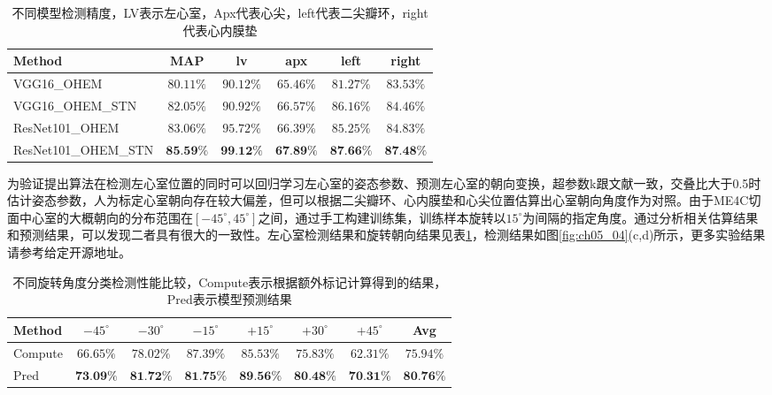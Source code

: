 \begin{table}[!htbp]
    \centering
    \footnotesize%
    \setlength{\tabcolsep}{4pt}%
    \renewcommand{\arraystretch}{1.2}%
    \begin{tabular}{lccccc}
        \cline{1-6}%
           \qquad Method  & MAP & lv &apx &left &right\\
         
        \hline
        VGG16\_OHEM & $80.11\%$ & $90.12\%$& $65.46\%$ & $81.27\%$& $83.53\%$\\        
        \hline
        VGG16\_OHEM\_STN & $82.05\%$ & $90.92\%$& $66.57\%$& $86.16\%$& $84.46\%$ \\
        \hline
        ResNet101\_OHEM & $83.06\%$ & $95.72\%$& $66.39\%$& $85.25\%$& $84.83\%$ \\
        \hline
        ResNet101\_OHEM\_STN & $\textbf{85.59\%}$ & $\textbf{99.12\%}$ & $\textbf{67.89\%}$ & $\textbf{87.66\%}$ & $\textbf{87.48\%}$\\
        \hline\hline
    \end{tabular}
    \caption{不同模型检测精度，LV表示左心室，Apx代表心尖，left代表二尖瓣环，right代表心内膜垫}
    \label{tab:ch05_03}
\end{table}


为验证提出算法在检测左心室位置的同时可以回归学习左心室的姿态参数、预测左心室的朝向变换，超参数k跟文献一致，交叠比大于0.5时估计姿态参数，人为标定心室朝向存在较大偏差，但可以根据二尖瓣环、心内膜垫和心尖位置估算出心室朝向角度作为对照。由于ME4C切面中心室的大概朝向的分布范围在$[-45^{\circ},45^{\circ}]$之间，通过手工构建训练集，训练样本旋转以$15^{\circ}$为间隔的指定角度。通过分析相关估算结果和预测结果，可以发现二者具有很大的一致性。左心室检测结果和旋转朝向结果见表\ref{tab:ch05_03}，检测结果如图\ref{fig:ch05_04}(c,d)所示，更多实验结果请参考给定开源地址。
\begin{table}[!htbp]
    \centering
    \footnotesize%
    \setlength{\tabcolsep}{4pt}%
    \renewcommand{\arraystretch}{1.2}%
    \begin{tabular}{lccccccc}
        \cline{1-8}%
           \qquad Method  & $-45^{\circ}$ & $-30^{\circ}$ & $-15^{\circ}$ & $+15^{\circ}$ & $+30^{\circ}$&$ +45^{\circ}$& Avg\\
         
        \hline
        Compute & $66.65\%$ & $78.02\%$& $87.39\%$& $85.53\%$& $75.83\%$ &$62.31\%$ &$75.94\%$  \\
        \hline
        Pred & $\textbf{73.09\%}$ & $\textbf{81.72\%}$ & $\textbf{81.75\%}$ & $\textbf{89.56\%}$ & $\textbf{80.48\%}$& $\textbf{70.31\%}$& $\textbf{80.76\%}$\\
        \hline\hline
    \end{tabular}
    \caption{不同旋转角度分类检测性能比较，Compute表示根据额外标记计算得到的结果，Pred表示模型预测结果}
    \label{tab:ch05_04}
\end{table}


